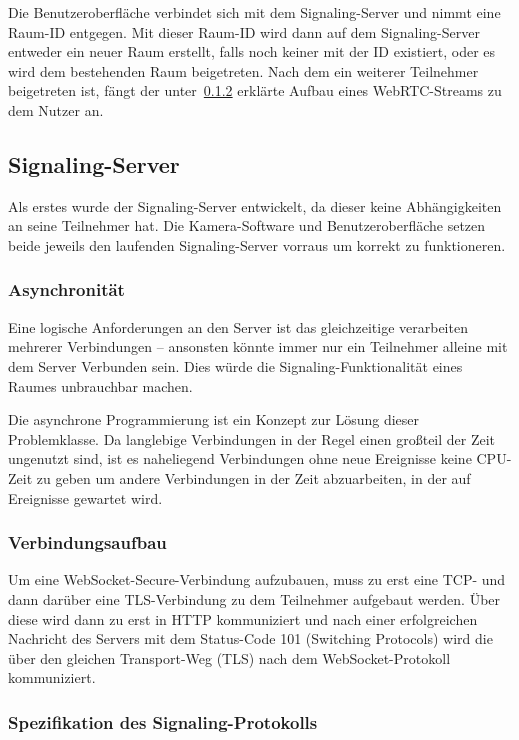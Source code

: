 \documentclass{article}
\begin{document}
\begin{onecolumn}
Die Benutzeroberfläche verbindet sich mit dem Signaling-Server und nimmt eine
Raum-ID entgegen. Mit dieser Raum-ID wird dann auf dem Signaling-Server
entweder ein neuer Raum erstellt, falls noch keiner mit der ID existiert, oder
es wird dem bestehenden Raum beigetreten. Nach dem ein weiterer Teilnehmer
beigetreten ist, fängt der unter~\ref{sec:signaling-spec} erklärte Aufbau eines
WebRTC-Streams zu dem Nutzer an.

\subsection{Signaling-Server}

Als erstes wurde der Signaling-Server entwickelt, da dieser keine
Abhängigkeiten an seine Teilnehmer hat. Die Kamera-Software und
Benutzeroberfläche setzen beide jeweils den laufenden Signaling-Server vorraus
um korrekt zu funktioneren.

\subsubsection*{Asynchronität}

Eine logische Anforderungen an den Server ist das gleichzeitige verarbeiten
mehrerer Verbindungen – ansonsten könnte immer nur ein Teilnehmer alleine mit
dem Server Verbunden sein. Dies würde die Signaling-Funktionalität eines Raumes
unbrauchbar machen.

Die asynchrone Programmierung ist ein Konzept zur Lösung dieser Problemklasse.
Da langlebige Verbindungen in der Regel einen großteil der Zeit ungenutzt sind,
ist es naheliegend Verbindungen ohne neue Ereignisse keine CPU-Zeit zu geben
um andere Verbindungen in der Zeit abzuarbeiten, in der auf Ereignisse gewartet
wird.

\subsubsection{Verbindungsaufbau}

Um eine WebSocket-Secure-Verbindung aufzubauen, muss zu erst eine TCP- und dann
darüber eine TLS-Verbindung zu dem Teilnehmer aufgebaut werden. Über diese wird
dann zu erst in HTTP kommuniziert und nach einer erfolgreichen Nachricht des
Servers mit dem Status-Code 101 (Switching Protocols) wird die über den
gleichen Transport-Weg (TLS) nach dem WebSocket-Protokoll kommuniziert.

\subsubsection{Spezifikation des Signaling-Protokolls}\label{sec:signaling-spec}


\end{onecolumn}
\end{document}
